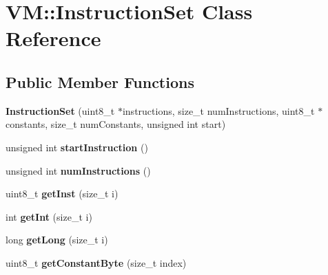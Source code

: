 \hypertarget{class_v_m_1_1_instruction_set}{\section{V\-M\-:\-:Instruction\-Set Class Reference}
\label{class_v_m_1_1_instruction_set}
}
\subsection*{Public Member Functions}
\begin{DoxyCompactItemize}
\item 
\hypertarget{class_v_m_1_1_instruction_set_ac918d9a6c6b641456621bb92df003501}{{\bfseries Instruction\-Set} (uint8\-\_\-t $\ast$instructions, size\-\_\-t num\-Instructions, uint8\-\_\-t $\ast$constants, size\-\_\-t num\-Constants, unsigned int start)}\label{class_v_m_1_1_instruction_set_ac918d9a6c6b641456621bb92df003501}

\item 
\hypertarget{class_v_m_1_1_instruction_set_a25b73973708552f8fa9b9085345275d9}{unsigned int {\bfseries start\-Instruction} ()}\label{class_v_m_1_1_instruction_set_a25b73973708552f8fa9b9085345275d9}

\item 
\hypertarget{class_v_m_1_1_instruction_set_af1fa310822cc58d475761c1cb9ef9b3d}{unsigned int {\bfseries num\-Instructions} ()}\label{class_v_m_1_1_instruction_set_af1fa310822cc58d475761c1cb9ef9b3d}

\item 
\hypertarget{class_v_m_1_1_instruction_set_ace5b6c7eccd511c0cbdcc9ab4a37bcee}{uint8\-\_\-t {\bfseries get\-Inst} (size\-\_\-t i)}\label{class_v_m_1_1_instruction_set_ace5b6c7eccd511c0cbdcc9ab4a37bcee}

\item 
\hypertarget{class_v_m_1_1_instruction_set_a25a498b927a5991bd08b73dc6aa913f8}{int {\bfseries get\-Int} (size\-\_\-t i)}\label{class_v_m_1_1_instruction_set_a25a498b927a5991bd08b73dc6aa913f8}

\item 
\hypertarget{class_v_m_1_1_instruction_set_aa75d28a6360445428f36c035d2a06ecf}{long {\bfseries get\-Long} (size\-\_\-t i)}\label{class_v_m_1_1_instruction_set_aa75d28a6360445428f36c035d2a06ecf}

\item 
\hypertarget{class_v_m_1_1_instruction_set_a991a1e003eb1c8c94ba4c916bd1eaa45}{uint8\-\_\-t {\bfseries get\-Constant\-Byte} (size\-\_\-t index)}\label{class_v_m_1_1_instruction_set_a991a1e003eb1c8c94ba4c916bd1eaa45}


\end{DoxyCompactItemize}
